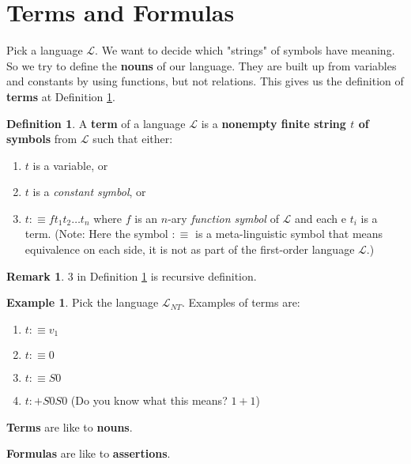 \documentclass[11pt,letterpaper]{book}
\theoremstyle{definition}
\newtheorem{definition}{Definition}[section]
\newtheorem{remark}{Remark}[section]
\newtheorem{example}{Example}[section]
\begin{document}
\section{Terms and Formulas}

Pick a language $\mathcal{L}$. We want to decide which "strings" of
symbols have meaning. So we try to define the \textbf{nouns} of our
language. They are built up from variables and constants by using
functions, but not relations. This gives us the definition of
\textbf{terms} at Definition \ref{def:term}.

\begin{definition}\label{def:term}
A \textbf{term} of a language $\mathcal{L}$ is a \textbf{nonempty finite
string $t$ of symbols} from $\mathcal{L}$ such that either:
\begin{enumerate}
\item{$t$ is a variable, or}
\item{$t$ is a \emph{constant symbol}, or}
\item{$t :\equiv f t_1 t_2 \ldots t_n$ where $f$ is an $n$-ary
\emph{function symbol} of $\mathcal{L}$ and each e $t_i$ is a term.
(Note: Here the symbol $:\equiv$ is a meta-linguistic symbol that means
equivalence on each side, it is not as part of the first-order language
$\mathcal{L}$.)}
\end{enumerate}
\end{definition}

\begin{remark}
$3$ in Definition \ref{def:term} is recursive definition.
\end{remark}

\begin{example}
Pick the language $\mathcal{L}_{NT}$. Examples of terms are:
\begin{enumerate}
\item{$t :\equiv v_{1}$}
\item{$t: \equiv 0$}
\item{$ t: \equiv S 0 $}
\item{$t: +S0S0$ (Do you know what this means? $1+1$)}
\end{enumerate}
\end{example}

\textbf{Terms} are like to \textbf{nouns}.

\textbf{Formulas} are like to \textbf{assertions}.
\end{document}
